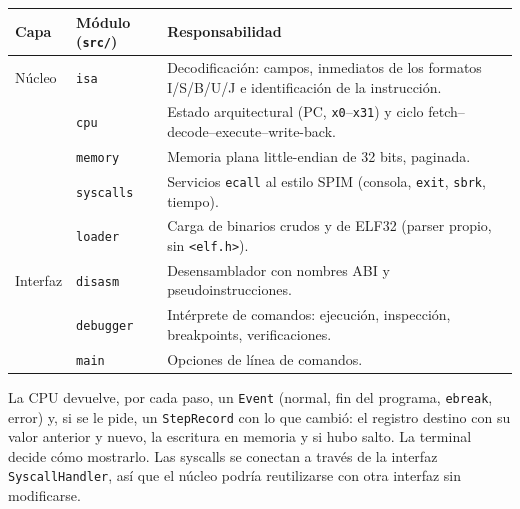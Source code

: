 \documentclass[11pt,a4paper]{article}
\newcommand{\cmd}[1]{\texttt{#1}}
\begin{document}
\begin{center}
\begin{tabularx}{\textwidth}{@{}l l X@{}}
\toprule
Capa & Módulo (\cmd{src/}) & Responsabilidad \\
\midrule
Núcleo & \cmd{isa} & Decodificación: campos, inmediatos de los formatos I/S/B/U/J e identificación de la instrucción. \\
       & \cmd{cpu} & Estado arquitectural (PC, \cmd{x0}--\cmd{x31}) y ciclo fetch--decode--execute--write-back. \\
       & \cmd{memory} & Memoria plana little-endian de 32 bits, paginada. \\
       & \cmd{syscalls} & Servicios \cmd{ecall} al estilo SPIM (consola, \cmd{exit}, \cmd{sbrk}, tiempo). \\
       & \cmd{loader} & Carga de binarios crudos y de ELF32 (parser propio, sin \cmd{<elf.h>}). \\
Interfaz & \cmd{disasm} & Desensamblador con nombres ABI y pseudoinstrucciones. \\
       & \cmd{debugger} & Intérprete de comandos: ejecución, inspección, breakpoints, verificaciones. \\
       & \cmd{main} & Opciones de línea de comandos. \\
\bottomrule
\end{tabularx}
\end{center}

La CPU devuelve, por cada paso, un \cmd{Event} (normal, fin del programa, \cmd{ebreak}, error) y, si se le pide,
un \cmd{StepRecord} con lo que cambió: el registro destino con su valor anterior y nuevo, la escritura en memoria y
si hubo salto. La terminal decide cómo mostrarlo. Las syscalls se conectan a través de la interfaz
\cmd{SyscallHandler}, así que el núcleo podría reutilizarse con otra interfaz sin modificarse.
\end{document}
